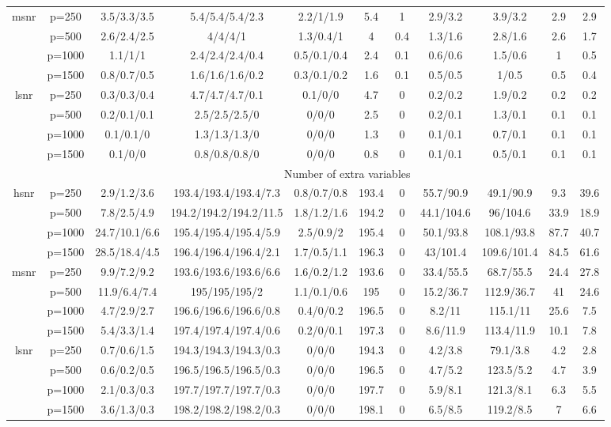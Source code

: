 \begin{table}[ht]
{\begin{tabular}{|c|c|ccccccccc|}
  \midrule\multirow{4}[2]{*}{msnr} & p=250 & 3.5/3.3/3.5 & 5.4/5.4/5.4/2.3 & 2.2/1/1.9 & 5.4 & 1 & 2.9/3.2 & 3.9/3.2 & 2.9 & 2.9 \\ 
   & p=500 & 2.6/2.4/2.5 & 4/4/4/1 & 1.3/0.4/1 & 4 & 0.4 & 1.3/1.6 & 2.8/1.6 & 2.6 & 1.7 \\ 
   & p=1000 & 1.1/1/1 & 2.4/2.4/2.4/0.4 & 0.5/0.1/0.4 & 2.4 & 0.1 & 0.6/0.6 & 1.5/0.6 & 1 & 0.5 \\ 
   & p=1500 & 0.8/0.7/0.5 & 1.6/1.6/1.6/0.2 & 0.3/0.1/0.2 & 1.6 & 0.1 & 0.5/0.5 & 1/0.5 & 0.5 & 0.4 \\ 
  \midrule\multirow{4}[2]{*}{lsnr} & p=250 & 0.3/0.3/0.4 & 4.7/4.7/4.7/0.1 & 0.1/0/0 & 4.7 & 0 & 0.2/0.2 & 1.9/0.2 & 0.2 & 0.2 \\ 
   & p=500 & 0.2/0.1/0.1 & 2.5/2.5/2.5/0 & 0/0/0 & 2.5 & 0 & 0.2/0.1 & 1.3/0.1 & 0.1 & 0.1 \\ 
   & p=1000 & 0.1/0.1/0 & 1.3/1.3/1.3/0 & 0/0/0 & 1.3 & 0 & 0.1/0.1 & 0.7/0.1 & 0.1 & 0.1 \\ 
   & p=1500 & 0.1/0/0 & 0.8/0.8/0.8/0 & 0/0/0 & 0.8 & 0 & 0.1/0.1 & 0.5/0.1 & 0.1 & 0.1 \\ 
   \midrule 
 \multicolumn{1}{|c}{} &       & \multicolumn{9}{c|}{Number of extra variables} \\
\midrule\multirow{4}[2]{*}{hsnr} & p=250 & 2.9/1.2/3.6 & 193.4/193.4/193.4/7.3 & 0.8/0.7/0.8 & 193.4 & 0 & 55.7/90.9 & 49.1/90.9 & 9.3 & 39.6 \\ 
   & p=500 & 7.8/2.5/4.9 & 194.2/194.2/194.2/11.5 & 1.8/1.2/1.6 & 194.2 & 0 & 44.1/104.6 & 96/104.6 & 33.9 & 18.9 \\ 
   & p=1000 & 24.7/10.1/6.6 & 195.4/195.4/195.4/5.9 & 2.5/0.9/2 & 195.4 & 0 & 50.1/93.8 & 108.1/93.8 & 87.7 & 40.7 \\ 
   & p=1500 & 28.5/18.4/4.5 & 196.4/196.4/196.4/2.1 & 1.7/0.5/1.1 & 196.3 & 0 & 43/101.4 & 109.6/101.4 & 84.5 & 61.6 \\ 
  \midrule\multirow{4}[2]{*}{msnr} & p=250 & 9.9/7.2/9.2 & 193.6/193.6/193.6/6.6 & 1.6/0.2/1.2 & 193.6 & 0 & 33.4/55.5 & 68.7/55.5 & 24.4 & 27.8 \\ 
   & p=500 & 11.9/6.4/7.4 & 195/195/195/2 & 1.1/0.1/0.6 & 195 & 0 & 15.2/36.7 & 112.9/36.7 & 41 & 24.6 \\ 
   & p=1000 & 4.7/2.9/2.7 & 196.6/196.6/196.6/0.8 & 0.4/0/0.2 & 196.5 & 0 & 8.2/11 & 115.1/11 & 25.6 & 7.5 \\ 
   & p=1500 & 5.4/3.3/1.4 & 197.4/197.4/197.4/0.6 & 0.2/0/0.1 & 197.3 & 0 & 8.6/11.9 & 113.4/11.9 & 10.1 & 7.8 \\ 
  \midrule\multirow{4}[2]{*}{lsnr} & p=250 & 0.7/0.6/1.5 & 194.3/194.3/194.3/0.3 & 0/0/0 & 194.3 & 0 & 4.2/3.8 & 79.1/3.8 & 4.2 & 2.8 \\ 
   & p=500 & 0.6/0.2/0.5 & 196.5/196.5/196.5/0.3 & 0/0/0 & 196.5 & 0 & 4.7/5.2 & 123.5/5.2 & 4.7 & 3.9 \\ 
   & p=1000 & 2.1/0.3/0.3 & 197.7/197.7/197.7/0.3 & 0/0/0 & 197.7 & 0 & 5.9/8.1 & 121.3/8.1 & 6.3 & 5.5 \\ 
   & p=1500 & 3.6/1.3/0.3 & 198.2/198.2/198.2/0.3 & 0/0/0 & 198.1 & 0 & 6.5/8.5 & 119.2/8.5 & 7 & 6.6 \\ 
   \bottomrule 
\end{tabular}
}
\end{table}
